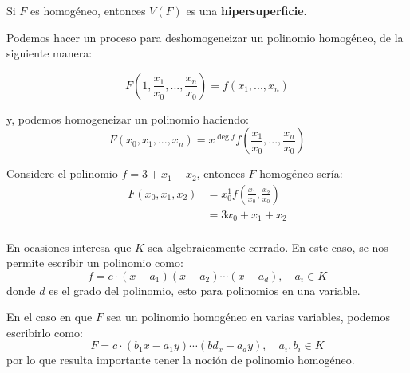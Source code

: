 \documentclass[12pt]{report}
\newcounter{it}
\theoremstyle{largebreak}
\begin{document}
    \begin{mydef}
        Si $F$ es homogéneo, entonces $V(F)$ es una \textbf{hipersuperficie}.
    \end{mydef}

    Podemos hacer un proceso para deshomogeneizar un polinomio homogéneo, de la siguiente manera:

    \begin{equation*}
        F\left(1,\frac{x_1}{x_0},...,\frac{x_n}{x_0} \right)=f(x_1,...,x_n)
    \end{equation*}

    y, podemos homogeneizar un polinomio haciendo:
    \begin{equation*}
        F(x_0,x_1,...,x_n)=x^{\deg f}f\left(\frac{x_1}{x_0},...,\frac{x_n}{x_0} \right)
    \end{equation*}

    \begin{exa}
        Considere el polinomio $f=3+x_1+x_2$, entonces $F$ homogéneo sería:
        \begin{equation*}
            \begin{split}
                F(x_0,x_1,x_2)&=x_0^1f\left(\frac{x_1}{x_0},\frac{x_2}{x_0}\right)\\
                &=3x_0+x_1+x_2\\
            \end{split}
        \end{equation*}
    \end{exa}

    \begin{obs}
        En ocasiones interesa que $K$ sea algebraicamente cerrado. En este caso, se nos permite escribir un polinomio como:
        \begin{equation*}
            f=c\cdot(x-a_1)(x-a_2)\cdots (x-a_d),\quad a_i\in K
        \end{equation*}
        donde $d$ es el grado del polinomio, esto para polinomios en una variable.
    \end{obs}

    \begin{obs}
        En el caso en que $F$ sea un polinomio homogéneo en varias variables, podemos escribirlo como:
        \begin{equation*}
            F=c\cdot( b_1x-a_1y)\cdots( bd_x-a_dy),\quad a_i,b_i\in K
        \end{equation*}
        por lo que resulta importante tener la noción de polinomio homogéneo.
    \end{obs}
\end{document}
